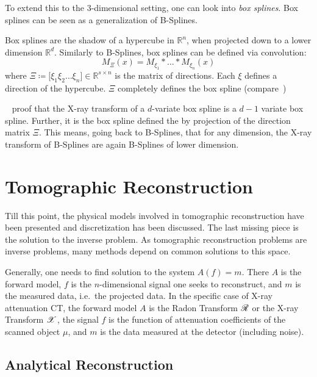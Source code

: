 To extend this to the \(3\)-dimensional setting, one can look into \textit{box splines}. Box splines
can be seen as a generalization of B-Splines.

\begin{definition}
	Box splines are the shadow of a hypercube in \(\mathbb{R}^n\), when projected down to a
	lower dimension \(\mathbb{R}^d\). Similarly to B-Splines, box splines can be defined via
	convolution:
	\begin{equation}
		M_\Xi(x) = M_{\xi_1} * \dots * M_{\xi_n}(x)
	\end{equation}
	where \(\Xi \coloneq \mathopen[ \xi_1 \xi_2 \dots \xi_n \mathclose] \in \mathbb{R}^{s \times n}\)
	is the matrix of directions. Each \(\xi\) defines a direction of the hypercube.
	\(\Xi\) completely defines the box spline (compare~\cite{de_boor_box_1993})
\end{definition}

\citeauthor{entezari_box_2012}~\cite{entezari_box_2012} proof that the X-ray transform of a
\(d\)-variate box spline is a \(d - 1\) variate box spline. Further, it is the box spline defined
the by projection of the direction matrix \(\Xi\). This means, going back to B-Splines, that for any
dimension, the X-ray transform of B-Splines are again B-Splines of lower dimension.

\chapter{Tomographic Reconstruction}\label{chap:tomographic_reconstruction}

Till this point, the physical models involved in tomographic reconstruction have been presented and
discretization has been discussed. The last missing piece is the solution to the inverse problem.
As tomographic reconstruction problems are inverse problems, many methods depend on common solutions
to this space.

Generally, one needs to find solution to the system \(A(f) = m\). There \(A\) is the forward model,
\(f\) is the \(n\)-dimensional signal one seeks to reconstruct, and \(m\) is the measured data, i.e.\
the projected data. In the specific case of X-ray attenuation CT, the forward model \(A\) is the
Radon Transform \(\mathscr{R}\) or the X-ray Transform \(\mathscr{X}\), the signal \(f\) is the function of
attenuation coefficients of the scanned object \(\mu\), and \(m\) is the data measured at the
detector (including noise).

\section{Analytical Reconstruction}\label{sec:analytical_reconstruction}


